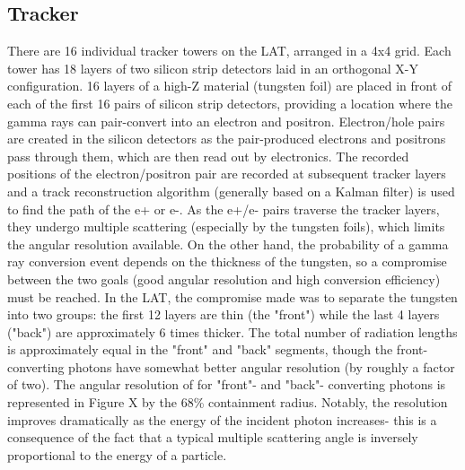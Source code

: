 \subsection{Tracker}
There are 16 individual tracker towers on the LAT, arranged in a 4x4 grid. Each tower has 18 layers of two silicon strip detectors laid in an orthogonal X-Y configuration. 16 layers of a high-Z material (tungsten foil) are placed in front of each of the first 16 pairs of silicon strip detectors, providing a location where the gamma rays can pair-convert into an electron and positron. Electron/hole pairs are created in the silicon detectors as the pair-produced electrons and positrons pass through them, which are then read out by electronics. The recorded positions of the electron/positron pair are recorded at subsequent tracker layers and a track reconstruction algorithm (generally based on a Kalman filter) is used to find the path of the e+ or e-.
As the e+/e- pairs traverse the tracker layers, they undergo multiple scattering (especially by the tungsten foils), which limits the angular resolution available. On the other hand, the probability of a gamma ray conversion event depends on the thickness of the tungsten, so a compromise between the two goals (good angular resolution and high conversion efficiency) must be reached. In the LAT, the compromise made was to separate the tungsten into two groups: the first 12 layers are thin (the "front") while the last 4 layers ("back") are approximately 6 times thicker. The total number of radiation lengths is approximately equal in the "front" and "back" segments, though the front-converting photons have somewhat better angular resolution (by roughly a factor of two). 
The angular resolution of \FermiLAT for "front"- and "back"- converting photons is represented in Figure X by the 68\% containment radius. Notably, the resolution improves dramatically as the energy of the incident photon increases- this is a consequence of the fact that a typical multiple scattering angle is inversely proportional to the energy of a particle.

